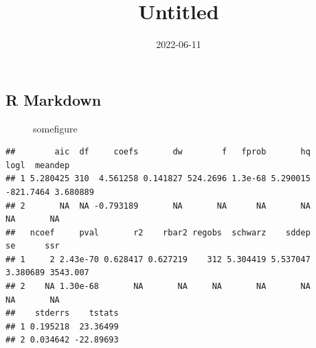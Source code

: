 \documentclass[
]{article}
\title{Untitled}
\author{}
\date{\vspace{-2.5em}2022-06-11}
\begin{document}
\maketitle

{
\setcounter{tocdepth}{2}
\tableofcontents
}
\hypertarget{r-markdown}{%
\subsection{R Markdown}\label{r-markdown}}

\begin{figure}[h]

{\centering {}

}

\caption{somefigure}\label{fig:mychunk-}
\end{figure}

\begin{verbatim}
##        aic  df     coefs       dw        f   fprob       hq      logl  meandep
## 1 5.280425 310  4.561258 0.141827 524.2696 1.3e-68 5.290015 -821.7464 3.680889
## 2       NA  NA -0.793189       NA       NA      NA       NA        NA       NA
##   ncoef     pval       r2    rbar2 regobs  schwarz    sddep       se      ssr
## 1     2 2.43e-70 0.628417 0.627219    312 5.304419 5.537047 3.380689 3543.007
## 2    NA 1.30e-68       NA       NA     NA       NA       NA       NA       NA
##    stderrs    tstats
## 1 0.195218  23.36499
## 2 0.034642 -22.89693
\end{verbatim}
\end{document}
